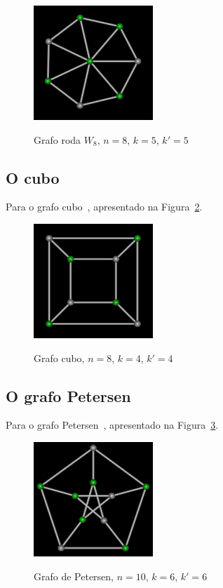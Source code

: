 \begin{figure}[htb]
\centering
\includegraphics[width=0.4\textwidth]{img/wheel.png}
\label{fig:example-wheel}
\caption{Grafo roda $W_8$, $n=8$, $k=5$, $k'=5$}
\end{figure}


\subsection{O cubo}
Para o grafo cubo~\cite{cite:example-plato},
apresentado na Figura~\ref{fig:example-cube}.

\begin{figure}[htb]
\centering
\includegraphics[width=0.4\textwidth]{img/cube.png}
\label{fig:example-cube}
\caption{Grafo cubo, $n=8$, $k=4$, $k'=4$}
\end{figure}


\subsection{O grafo Petersen}
Para o grafo Petersen~\cite{cite:example-petersen},
apresentado na Figura~\ref{fig:example-petersen}.

\begin{figure}[htb]
\centering
\includegraphics[width=0.4\textwidth]{img/petersen.png}
\label{fig:example-petersen}
\caption{Grafo de Petersen, $n=10$, $k=6$, $k'=6$}
\end{figure}


